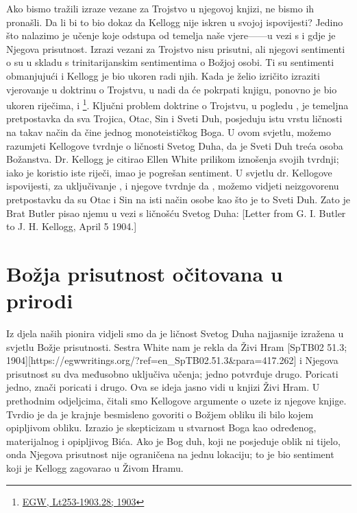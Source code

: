 Ako bismo tražili izraze vezane za Trojstvo u njegovoj knjizi, ne bismo ih pronašli. Da li bi to bio dokaz da Kellogg nije iskren u svojoj ispovijesti? Jedino što nalazimo je učenje koje odstupa od temelja naše vjere——u vezi s  i gdje je Njegova prisutnost. Izrazi vezani za Trojstvo nisu prisutni, ali njegovi sentimenti o  su u skladu s trinitarijanskim sentimentima o Božjoj osobi. Ti su sentimenti obmanjujući i Kellogg je bio ukoren radi njih. Kada je želio izričito izraziti vjerovanje u doktrinu o Trojstvu, u nadi da će pokrpati knjigu, ponovno je bio ukoren riječima,  i \footnote{\href{https://egwwritings.org/?ref=en_Lt253-1903.28&para=9980.36}{EGW, Lt253-1903.28; 1903}}. Ključni problem doktrine o Trojstvu, u pogledu , je temeljna pretpostavka da sva Trojica, Otac, Sin i Sveti Duh, posjeduju istu vrstu ličnosti na takav način da čine jednog monoteističkog Boga. U ovom svjetlu, možemo razumjeti Kellogove tvrdnje o ličnosti Svetog Duha, da je Sveti Duh treća osoba Božanstva. Dr. Kellogg je citirao Ellen White prilikom iznošenja svojih tvrdnji; iako je koristio iste riječi, imao je pogrešan sentiment. U svjetlu dr. Kellogove ispovijesti, za uključivanje , i njegove tvrdnje da , možemo vidjeti neizgovorenu pretpostavku da su Otac i Sin na isti način osobe kao što je to Sveti Duh. Zato je Brat Butler pisao njemu u vezi s ličnošću Svetog Duha: [Letter from G. I. Butler to J. H. Kellogg, April 5 1904.]

\section*{Božja prisutnost očitovana u prirodi}

Iz djela naših pionira vidjeli smo da je ličnost Svetog Duha najjasnije izražena u svjetlu Božje prisutnosti. Sestra White nam je rekla da Živi Hram [SpTB02 51.3; 1904][https://egwwritings.org/?ref=en\_SpTB02.51.3&para=417.262]  i Njegova prisutnost su dva međusobno uključiva učenja; jedno potvrđuje drugo. Poricati jedno, znači poricati i drugo. Ova se ideja jasno vidi u knjizi Živi Hram. U prethodnim odjeljcima, čitali smo Kellogove argumente o  uzete iz njegove knjige. Tvrdio je da je krajnje besmisleno govoriti o Božjem obliku ili bilo kojem opipljivom obliku. Izrazio je skepticizam u stvarnost Boga kao određenog, materijalnog i opipljivog Bića. Ako je Bog duh, koji ne posjeduje oblik ni tijelo, onda Njegova prisutnost nije ograničena na jednu lokaciju; to je bio sentiment koji je Kellogg zagovarao u Živom Hramu.

